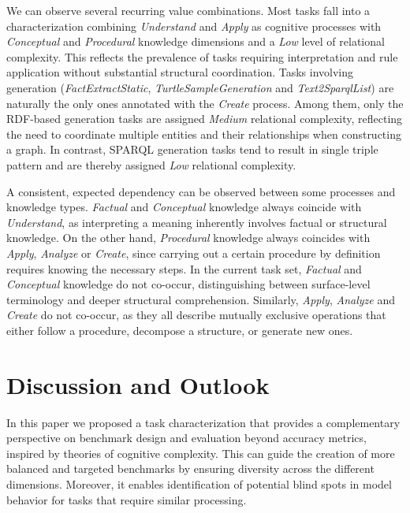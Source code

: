 \documentclass[
]{ceurart}
\begin{document}
We can observe several recurring value combinations. Most tasks fall into a characterization combining \emph{Understand} and \emph{Apply} as cognitive processes with \emph{Conceptual} and \emph{Procedural} knowledge dimensions and a \emph{Low} level of relational complexity. This reflects the prevalence of tasks requiring interpretation and rule application without substantial structural coordination. Tasks involving generation (\emph{FactExtractStatic}, \emph{TurtleSampleGeneration} and \emph{Text2SparqlList}) are naturally the only ones annotated with the \emph{Create} process. Among them, only the RDF-based generation tasks are assigned \emph{Medium} relational complexity, reflecting the need to coordinate multiple entities and their relationships when constructing a graph. In contrast, SPARQL generation tasks tend to result in single triple pattern and are thereby assigned \emph{Low} relational complexity.

A consistent, expected dependency can be observed between some processes and knowledge types. \emph{Factual} and \emph{Conceptual} knowledge always coincide with \emph{Understand}, as interpreting a meaning inherently involves factual or structural knowledge. On the other hand, \emph{Procedural} knowledge always coincides with \emph{Apply}, \emph{Analyze} or \emph{Create}, since carrying out a certain procedure by definition requires knowing the necessary steps. In the current task set, \emph{Factual} and \emph{Conceptual} knowledge do not co-occur, distinguishing between surface-level terminology and deeper structural comprehension. Similarly, \emph{Apply}, \emph{Analyze} and \emph{Create} do not co-occur, as they all describe mutually exclusive operations that either follow a procedure, decompose a structure, or generate new ones.

\section{Discussion and Outlook}
In this paper we proposed a task characterization that provides a complementary perspective on benchmark design and evaluation beyond accuracy metrics, inspired by theories of cognitive complexity. This can guide the creation of more balanced and targeted benchmarks by ensuring diversity across the different dimensions. Moreover, it enables identification of potential blind spots in model behavior for tasks that require similar processing.
\end{document}
